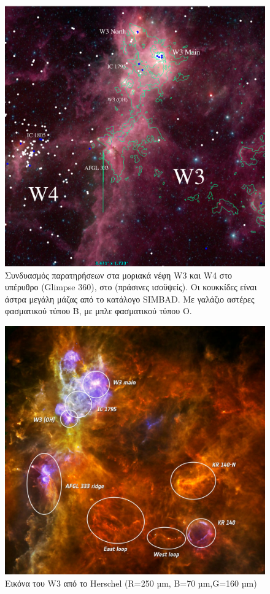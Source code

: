 \documentclass[a4paper,12pt]{memoir}
\begin{document}
\begin{figure}[hb]
	\centering
	\includegraphics[width=13cm]{images/infrared-CO-OB.ps}
	\caption{Συνδυασμός παρατηρήσεων στα μοριακά νέφη W3 και W4 στο υπέρυθρο (Glimpse 360), στο  (πράσινες ισοϋψείς). Οι κουκκίδες είναι άστρα μεγάλη μάζας από το κατάλογο SIMBAD. Με γαλάζιο αστέρες φασματικού τύπου B, με μπλε φασματικού τύπου O.}
\end{figure}


\begin{figure}[hb]
	\centering
	\includegraphics[width=13cm]{images/w3_70_160_250_annotated.jpg}
	\caption{Εικόνα του W3 από το Herschel (R=250 µm, B=70 µm,G=160 µm)}
\end{figure}
\end{document}
